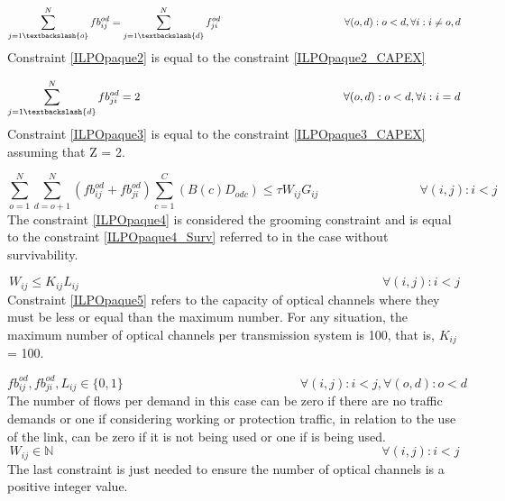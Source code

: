 \begin{equation}
\sum_{j=1\textbackslash \{o\}}^{N} fb_{ij}^{od} = \sum_{j=1\textbackslash \{d\}}^{N} f_{ji}^{od}   \qquad \qquad \qquad \qquad \qquad \qquad
\forall(o,d) : o < d, \forall i: i \neq o,d
\label{ILPOpaque2}
\end{equation}
\noindent
Constraint \ref{ILPOpaque2} is equal to the constraint \ref{ILPOpaque2_CAPEX}

\begin{equation}
\sum_{j=1\textbackslash \{d\}}^{N} fb_{ji}^{od} = 2  \qquad \qquad \qquad \qquad \qquad \qquad \qquad \qquad \qquad
\forall(o,d) : o < d, \forall i: i = d
\label{ILPOpaque3}
\end{equation}
\noindent
Constraint \ref{ILPOpaque3} is equal to the constraint \ref{ILPOpaque3_CAPEX} assuming that Z = 2.

\begin{equation}
\sum_{o=1}^{N} \sum_{d=o+1}^{N} \left(fb_{ij}^{od} + fb_{ji}^{od}\right) \sum_{c=1}^{C} (B\left(c\right) D_{odc})\leq \tau W_{ij} G_{ij} \qquad \qquad \qquad \qquad
\forall(i,j) : i < j
\label{ILPOpaque4}
\end{equation}
\noindent
The constraint \ref{ILPOpaque4} is considered the grooming constraint and is equal to the constraint \ref{ILPOpaque4_Surv} referred to in the case without survivability.

\begin{equation}
W_{ij} \leq K_{ij} L_{ij} \qquad \qquad \qquad \qquad \qquad \qquad \qquad \qquad \qquad \qquad \qquad \qquad \forall(i,j) : i < j
\label{ILPOpaque5}
\end{equation}
\noindent
Constraint \ref{ILPOpaque5} refers to the capacity of optical channels where they must be less or equal than the maximum number. For any situation, the maximum number of optical channels per transmission system is 100, that is, $K_{ij}$ = 100.

\begin{equation}
fb_{ij}^{od} , fb_{ji}^{od} , L_{ij} \in \{0,1\} \qquad \qquad \qquad \qquad \qquad \qquad \qquad
\forall(i,j) : i < j, \forall(o,d) : o < d
\label{ILPOpaque6}
\end{equation}
\noindent
The number of flows per demand in this case can be zero if there are no traffic demands or one if considering working or protection traffic, in relation to the use of the link, can be zero if it is not being used or one if is being used.
\newpage
\begin{equation}
W_{ij} \in \mathbb{N}  \qquad \qquad \qquad \qquad \qquad \qquad \qquad \qquad \qquad \qquad \qquad \qquad \qquad
\forall(i,j) : i < j\label{ILPOpaque7}
\end{equation}
\noindent
The last constraint is just needed to ensure the number of optical channels is a positive integer value.\\


